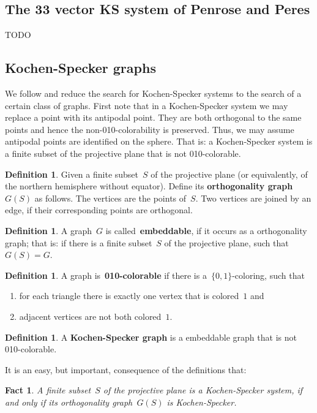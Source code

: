 \documentclass[a4paper]{article}
\newcommand{\keyword}[1]{\textbf{#1}}
\newcounter{main}
\newtheorem{fact}[main]{Fact}
\theoremstyle{definition}
\newtheorem{dfn}[main]{Definition}
\theoremstyle{remark}
\begin{document}
\subsection{The 33 vector KS system of Penrose and Peres}
TODO

\subsection{Kochen-Specker graphs}
We follow \cite{aow11} and reduce the search for Kochen-Specker systems
to the search of a certain class of graphs.
First note that in a Kochen-Specker system we may replace a point with its
antipodal point.  They are both orthogonal to the same points and hence
the non-010-colorability is preserved.
Thus, we may assume antipodal points are identified on the sphere.
That is: a Kochen-Specker system is a finite subset of the projective plane
that is not 010-colorable.
\begin{dfn}
Given a finite subset~$S$ of the projective plane
(or equivalently, of the northern hemisphere without equator).
Define its \keyword{orthogonality graph}~$G(S)$ as follows.
The vertices are the points of~$S$.
Two vertices are joined by an edge, if their corresponding points
are orthogonal.
\end{dfn}
\begin{dfn}
A graph~$G$ is called~\keyword{embeddable},
if it occurs as a orthogonality graph;
that is: if there is a finite subset~$S$ of the projective plane,
such that~$G(S) = G$.
\end{dfn}
\begin{dfn}
A graph is~\keyword{010-colorable}
if there is a~$\{0,1\}$-coloring, such that
\begin{enumerate}
\item
for each triangle there is exactly one vertex that is colored~$1$ and
\item
adjacent vertices are not both colored~$1$.
\end{enumerate}
\end{dfn}
\begin{dfn}
A \keyword{Kochen-Specker graph}
is a embeddable graph that is not 010-colorable.
\end{dfn}
It is an easy, but important, consequence of the definitions that:
\begin{fact}
    A finite subset~$S$ of the projective plane
    is a Kochen-Specker system,
    if and only if its orthogonality graph~$G(S)$
    is Kochen-Specker.
\end{fact}
\end{document}
